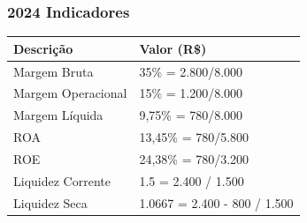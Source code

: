\subsubsection{2024 Indicadores}
 \begin{tabular}{p{5cm} l}                                                     
 \toprule                                                                       
 \textbf{Descrição} & \textbf{Valor (R\$)} \\                                   
 \midrule                                                                       
 Margem Bruta & 35\% = 2.800/8.000 \\                                        
 \midrule                                                                       
 Margem Operacional  & 15\% = 1.200/8.000 \\                                                 
 \midrule                                                                       
 Margem Líquida & 9,75\% = 780/8.000 \\                                                     
  \midrule                                                                       
 ROA & 13,45\% = 780/5.800 \\                                               
 \midrule                                                                       
 ROE & 24,38\% = 780/3.200 \\                                        
 \midrule                                                                       
 Liquidez Corrente & 1.5 = 2.400 / 1.500 \\                                        
 \midrule                                                                       
 Liquidez Seca & 1.0667 = 2.400 - 800 /  1.500 \\ 
 \bottomrule                                                                    
 \end{tabular}                                                                  
